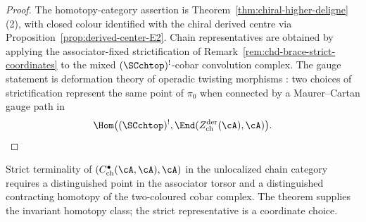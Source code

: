 \begin{proof}
The homotopy-category assertion is
Theorem~\ref{thm:chiral-higher-deligne}(2), with closed colour
identified with the chiral derived centre via
Proposition~\ref{prop:derived-center-E2}. Chain representatives are
obtained by applying the associator-fixed strictification of
Remark~\ref{rem:chd-brace-strict-coordinates} to the mixed
$(\SCchtop)^!$-cobar convolution complex. The gauge statement is
deformation theory of operadic twisting morphisms
\cite[Chs.~6, 10]{LV12}: two choices of strictification represent the
same point of $\pi_0$ when connected by a
Maurer--Cartan gauge path in
\[
\Hom\bigl((\SCchtop)^!,\End(Z^{\mathrm{der}}_{\mathrm{ch}}(\cA),\cA)\bigr).
\]
\end{proof}

\begin{remark}%
Strict terminality of
$(C^\bullet_{\mathrm{ch}}(\cA,\cA),\cA)$ in the unlocalized
chain category requires a distinguished point in the
associator torsor and a distinguished contracting homotopy of the
two-coloured cobar complex. The theorem supplies the invariant
homotopy class; the strict representative is a coordinate choice.
\end{remark}


